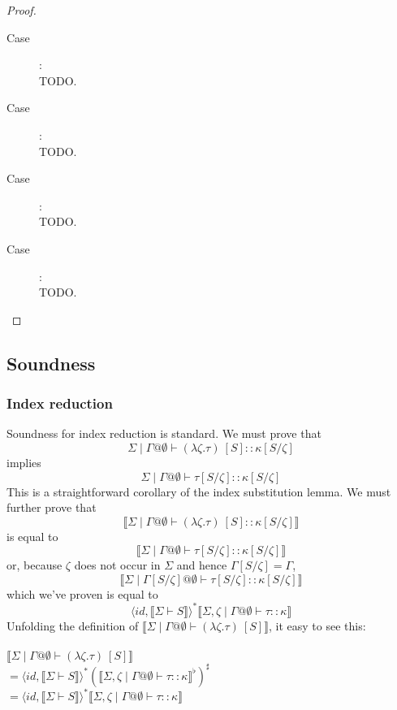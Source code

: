 \documentclass{article}
\newcommand{\sem}[1]{\llbracket #1 \rrbracket}
\begin{document}
\begin{proof}
\begin{description}
\item[Case \begin{sc}StrAbs\end{sc}]:~\\

TODO.

\item[Case ]:~\\

TODO.

\item[Case ]:~\\

TODO.

\item[Case ]:~\\

TODO.

\end{description}

\end{proof}

\subsection*{Soundness}

\subsubsection*{Index reduction}

Soundness for index reduction is standard. We must prove that $$\Sigma \mid \Gamma @ \emptyset \vdash (\lambda \zeta.\tau)~[S] :: \kappa[S/\zeta]$$ implies $$\Sigma \mid \Gamma @ \emptyset \vdash \tau[S/\zeta] :: \kappa[S/\zeta]$$ This is a straightforward corollary of the index substitution lemma.
We must further prove that $$\sem{\Sigma \mid \Gamma @ \emptyset \vdash (\lambda \zeta.\tau)~[S] :: \kappa[S/\zeta]}$$
is equal to $$\sem{\Sigma \mid \Gamma @ \emptyset \vdash \tau[S/\zeta] :: \kappa[S/\zeta]}$$ or, because $\zeta$ does not occur in $\Sigma$ and hence $\Gamma[S/\zeta] = \Gamma$, $$\sem{\Sigma \mid \Gamma[S/\zeta] @ \emptyset \vdash \tau[S/\zeta] :: \kappa[S/\zeta]}$$ which we've proven is equal to $$\langle \mathit{id}, \sem{\Sigma \vdash S} \rangle^* \sem{\Sigma,\zeta \mid \Gamma @ \emptyset \vdash \tau :: \kappa}$$
Unfolding the definition of $\sem{\Sigma \mid \Gamma @ \emptyset \vdash (\lambda \zeta. \tau)~[S]}$, it easy to see this:\\~\\
$\sem{\Sigma \mid \Gamma @ \emptyset \vdash (\lambda \zeta. \tau)~[S]}$\\
$= \langle \mathit{id}, \sem{\Sigma \vdash S} \rangle^* (\sem{\Sigma,\zeta \mid \Gamma @ \emptyset \vdash \tau :: \kappa}^\flat)^\sharp$\\
$= \langle \mathit{id}, \sem{\Sigma \vdash S} \rangle^* \sem{\Sigma,\zeta \mid \Gamma @ \emptyset \vdash \tau :: \kappa}$ 
\end{document}
